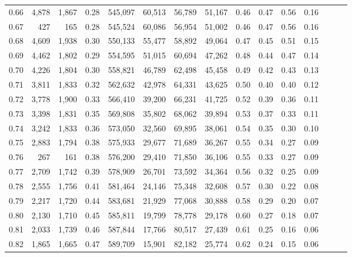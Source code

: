 \begin{tabular}{rrrrrrrrrrrrrrr}
0.66 &   4,878 &  1,867 &  0.28 &  545,097 &   60,513 &   56,789 &   51,167 &  0.46 &  0.47 &  0.56 &      0.16 \\
0.67 &     427 &    165 &  0.28 &  545,524 &   60,086 &   56,954 &   51,002 &  0.46 &  0.47 &  0.56 &      0.16 \\
0.68 &   4,609 &  1,938 &  0.30 &  550,133 &   55,477 &   58,892 &   49,064 &  0.47 &  0.45 &  0.51 &      0.15 \\
0.69 &   4,462 &  1,802 &  0.29 &  554,595 &   51,015 &   60,694 &   47,262 &  0.48 &  0.44 &  0.47 &      0.14 \\
0.70 &   4,226 &  1,804 &  0.30 &  558,821 &   46,789 &   62,498 &   45,458 &  0.49 &  0.42 &  0.43 &      0.13 \\
0.71 &   3,811 &  1,833 &  0.32 &  562,632 &   42,978 &   64,331 &   43,625 &  0.50 &  0.40 &  0.40 &      0.12 \\
0.72 &   3,778 &  1,900 &  0.33 &  566,410 &   39,200 &   66,231 &   41,725 &  0.52 &  0.39 &  0.36 &      0.11 \\
0.73 &   3,398 &  1,831 &  0.35 &  569,808 &   35,802 &   68,062 &   39,894 &  0.53 &  0.37 &  0.33 &      0.11 \\
0.74 &   3,242 &  1,833 &  0.36 &  573,050 &   32,560 &   69,895 &   38,061 &  0.54 &  0.35 &  0.30 &      0.10 \\
0.75 &   2,883 &  1,794 &  0.38 &  575,933 &   29,677 &   71,689 &   36,267 &  0.55 &  0.34 &  0.27 &      0.09 \\
0.76 &     267 &    161 &  0.38 &  576,200 &   29,410 &   71,850 &   36,106 &  0.55 &  0.33 &  0.27 &      0.09 \\
0.77 &   2,709 &  1,742 &  0.39 &  578,909 &   26,701 &   73,592 &   34,364 &  0.56 &  0.32 &  0.25 &      0.09 \\
0.78 &   2,555 &  1,756 &  0.41 &  581,464 &   24,146 &   75,348 &   32,608 &  0.57 &  0.30 &  0.22 &      0.08 \\
0.79 &   2,217 &  1,720 &  0.44 &  583,681 &   21,929 &   77,068 &   30,888 &  0.58 &  0.29 &  0.20 &      0.07 \\
0.80 &   2,130 &  1,710 &  0.45 &  585,811 &   19,799 &   78,778 &   29,178 &  0.60 &  0.27 &  0.18 &      0.07 \\
0.81 &   2,033 &  1,739 &  0.46 &  587,844 &   17,766 &   80,517 &   27,439 &  0.61 &  0.25 &  0.16 &      0.06 \\
0.82 &   1,865 &  1,665 &  0.47 &  589,709 &   15,901 &   82,182 &   25,774 &  0.62 &  0.24 &  0.15 &      0.06 \\

\end{tabular}
